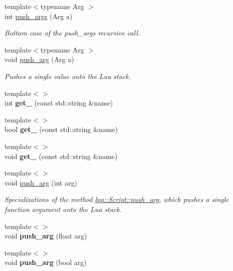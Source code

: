 \begin{DoxyCompactItemize}
{\footnotesize template$<$typename Arg $>$ }\\int \hyperlink{classlpp_1_1_script_a9c83737f00a0613efa0276bc94ea47dd}{push\+\_\+args} (Arg a)
\begin{DoxyCompactList}\small\item\em Bottom case of the push\+\_\+args recursive call. \end{DoxyCompactList}\item 
{\footnotesize template$<$typename Arg $>$ }\\void \hyperlink{classlpp_1_1_script_a9ecaddf33b0978b245ebf787a22ea173}{push\+\_\+arg} (Arg a)
\begin{DoxyCompactList}\small\item\em Pushes a single value onto the Lua stack. \end{DoxyCompactList}\item 
{\footnotesize template$<$$>$ }\\int {\bfseries get\+\_\+} (const std\+::string \&name)\hypertarget{classlpp_1_1_script_a14decfe611481d7bbcedad5da49081ba}{}\label{classlpp_1_1_script_a14decfe611481d7bbcedad5da49081ba}

\item 
{\footnotesize template$<$$>$ }\\bool {\bfseries get\+\_\+} (const std\+::string \&name)\hypertarget{classlpp_1_1_script_a085e23878a5e24c08ea1764750f1267a}{}\label{classlpp_1_1_script_a085e23878a5e24c08ea1764750f1267a}

\item 
{\footnotesize template$<$$>$ }\\void {\bfseries get\+\_\+} (const std\+::string \&name)\hypertarget{classlpp_1_1_script_a7fbc6d125505b00eff3217f948de50d7}{}\label{classlpp_1_1_script_a7fbc6d125505b00eff3217f948de50d7}

\item 
{\footnotesize template$<$$>$ }\\void \hyperlink{classlpp_1_1_script_a9eb70929df748e82de5b01884fab47af}{push\+\_\+arg} (int arg)
\begin{DoxyCompactList}\small\item\em Specializations of the method \hyperlink{classlpp_1_1_script_a9ecaddf33b0978b245ebf787a22ea173}{lpp\+::\+Script\+::push\+\_\+arg}, which pushes a single function argument onto the Lua stack. \end{DoxyCompactList}\item 
{\footnotesize template$<$$>$ }\\void {\bfseries push\+\_\+arg} (float arg)\hypertarget{classlpp_1_1_script_a7bbb0cfd6cd1c3d6192f72d7c8fd3c55}{}\label{classlpp_1_1_script_a7bbb0cfd6cd1c3d6192f72d7c8fd3c55}

\item 
{\footnotesize template$<$$>$ }\\void {\bfseries push\+\_\+arg} (bool arg)\hypertarget{classlpp_1_1_script_a7338f6a1d447a3da273085c566f30645}{}\label{classlpp_1_1_script_a7338f6a1d447a3da273085c566f30645}

\end{DoxyCompactItemize}
